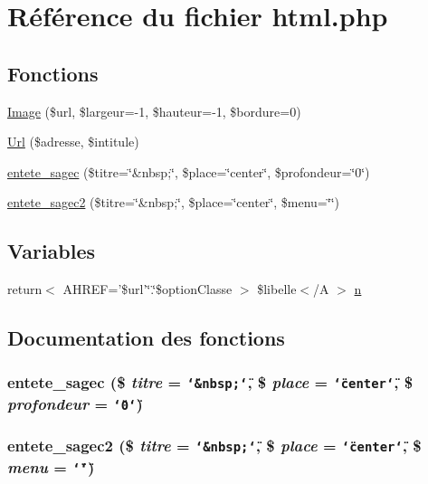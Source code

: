 \hypertarget{html_8php}{
\section{R\'{e}f\'{e}rence du fichier html.php}
\label{html_8php}
}
\subsection*{Fonctions}
\begin{CompactItemize}
\item 
\hyperlink{html_8php_a1}{Image} (\$url, \$largeur=-1, \$hauteur=-1, \$bordure=0)
\item 
\hyperlink{html_8php_a2}{Url} (\$adresse, \$intitule)
\item 
\hyperlink{html_8php_a3}{entete\_\-sagec} (\$titre=\char`\"{}\&nbsp;\char`\"{}, \$place=\char`\"{}center\char`\"{}, \$profondeur=\char`\"{}0\char`\"{})
\item 
\hyperlink{html_8php_a4}{entete\_\-sagec2} (\$titre=\char`\"{}\&nbsp;\char`\"{}, \$place=\char`\"{}center\char`\"{}, \$menu=\char`\"{}\char`\"{})
\end{CompactItemize}
\subsection*{Variables}
\begin{CompactItemize}
\item 
return$<$ AHREF='\$url'\char`\"{}.\char`\"{}\$option\-Classe $>$ \$libelle$<$/A $>$ \hyperlink{html_8php_a0}{n}
\end{CompactItemize}


\subsection{Documentation des fonctions}
\hypertarget{html_8php_a3}{
\subsubsection[entete\_\-sagec]{\setlength{\rightskip}{0pt plus 5cm}entete\_\-sagec (\$ {\em titre} = {\tt \char`\"{}\&nbsp;\char`\"{}}, \$ {\em place} = {\tt \char`\"{}center\char`\"{}}, \$ {\em profondeur} = {\tt \char`\"{}0\char`\"{}})}}
\label{html_8php_a3}


\hypertarget{html_8php_a4}{
\subsubsection[entete\_\-sagec2]{\setlength{\rightskip}{0pt plus 5cm}entete\_\-sagec2 (\$ {\em titre} = {\tt \char`\"{}\&nbsp;\char`\"{}}, \$ {\em place} = {\tt \char`\"{}center\char`\"{}}, \$ {\em menu} = {\tt \char`\"{}\char`\"{}})}}
\label{html_8php_a4}


